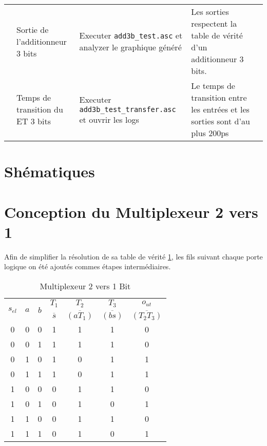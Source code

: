 \documentclass[a11paper]{article}
\newcommand{\quicktab}[4]{
  \begin{table}[H]
    \centering
    \caption{#1}
    \label{tab:#2}
    \begin{tabular}{#3}
      #4
    \end{tabular}
  \end{table}
}
\newcommand{\cbox}{\fbox{\phantom{\ding{51}}}}
\newcounter{tid}
\newcommand{\tid}{\stepcounter{tid}\thetid}
\begin{document}
\begin{center}
\begin{longtable}{lp{4cm}p{4cm}p{5cm}l}

    \tid &
    Sortie de l'additionneur 3 bits &
		Executer \verb|add3b_test.asc| et analyzer le graphique généré &
		Les sorties respectent la table de vérité d'un additionneur 3 bits. &
		\cbox \\

    \tid &
    Temps de transition du ET 3 bits &
		Executer \verb|add3b_test_transfer.asc| et ouvrir les logs &
		Le temps de transition entre les entrées et les sorties sont d'au plus 200ps &
		\cbox \\


	\end{longtable}
\end{center}

\section{Shématiques}
\label{appdx:schematics}

\section{Conception du Multiplexeur 2 vers 1}

Afin de simplifier la résolution de sa table de vérité \ref{tab:mux2x1b}, les fils suivant chaque porte logique
on été ajoutés commes étapes intermédiaires.

\quicktab{Multiplexeur 2 vers 1 Bit}{mux2x1b}{ccccccc}{
  \toprule
  \multirow{2}{*}{$s_{el}$} &
  \multirow{2}{*}{$a$} &
  \multirow{2}{*}{$b$} &
  $T_1$ &
  $T_2$ &
  $T_3$ &
  $o_{ut}$ \\
  & & &
  $\overline{s}$ &
  $\overline{(aT_1)}$ &
  $\overline{(bs)}$ &
  $\overline{(T_2T_3)}$ \\
  \midrule
  0&0&0&1&1&1&0 \\
  0&0&1&1&1&1&0 \\
  0&1&0&1&0&1&1 \\
  0&1&1&1&0&1&1 \\
  1&0&0&0&1&1&0 \\
  1&0&1&0&1&0&1 \\
  1&1&0&0&1&1&0 \\
  1&1&1&0&1&0&1
  \\
  \bottomrule
}
\end{document}
